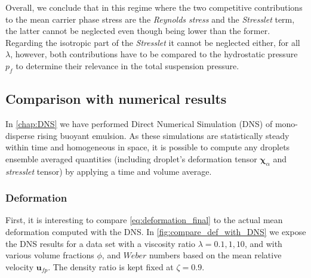 Overall, we conclude that in this regime where the two competitive contributions to the mean carrier phase stress are the \textit{Reynolds stress} and the \textit{Stresslet} term, the latter cannot be neglected even though being lower than the former. 
Regarding the isotropic part of the \textit{Stresslet} it cannot be neglected either, for all $\lambda$, however, both contributions have to be compared to the hydrostatic pressure $p_f$ to determine their relevance in the total suspension pressure.

\subsection{Comparison with numerical results}

In \ref{chap:DNS} we have performed Direct Numerical Simulation (DNS) of mono-disperse rising buoyant emulsion. 
As these simulations are statistically steady within time and homogeneous in space, it is possible to compute any droplets ensemble averaged quantities (including droplet's deformation tensor $\bm\chi_\alpha$ and \textit{stresslet} tensor) by applying a time and volume average.


\subsubsection{Deformation}

First, it is interesting to compare \ref{eq:deformation_final} to the actual mean deformation computed with the DNS. 
In \ref{fig:compare_def_with_DNS} we expose the DNS results for a data set with a viscosity ratio $\lambda = 0.1, 1, 10$, and with various volume fractions $\phi$,  and $Weber$ numbers based on the mean relative velocity $\textbf{u}_{fp}$. 
The density ratio is kept fixed at $\zeta = 0.9$. 

